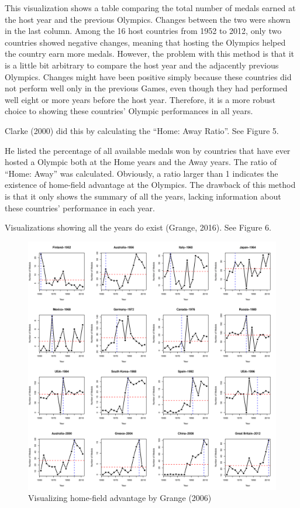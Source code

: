 \documentclass[12pt]{article}
\begin{document}
This visualization shows a table comparing the total number of medals earned at the host year and the previous Olympics. Changes between the two were shown in the last column.  Among the 16 host countries from 1952 to 2012, only two countries showed negative changes, meaning that hosting the Olympics helped the country earn more medals. However, the problem with this method is that it is a little bit arbitrary to compare the host year and the adjacently previous Olympics. Changes might have been positive simply because these countries did not perform well only in the previous Games, even though they had performed well eight or more years before the host year. Therefore, it is a more robust choice to showing these countries’ Olympic performances in all years. 

Clarke (2000) did this by calculating the “Home: Away Ratio”. See Figure 5.

He listed the percentage of all available medals won by countries that have ever hosted a Olympic both at the Home years and the Away years. The ratio of “Home: Away” was calculated. Obviously, a ratio larger than 1 indicates the existence of home-field advantage at the Olympics. The drawback of this method is that it only shows the summary of all the years, lacking information about these countries’ performance in each year. 

Visualizations showing all the years do exist (Grange, 2016). See Figure 6.
\begin{figure}[!b]
    \centering
    \includegraphics[scale=0.215]{pics/2-2.png}
    \caption{Visualizing home-field advantage by Grange (2006)}
    \label{fig:my_label}
\end{figure}
\FloatBarrier %
\end{document}

